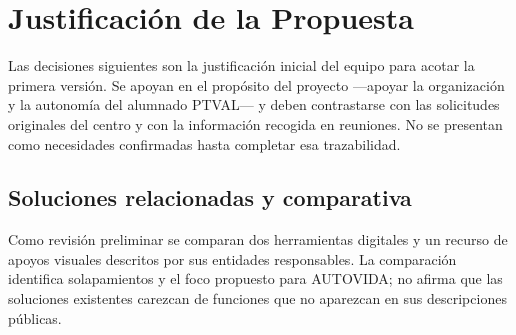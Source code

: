 \newpage
\section{Justificación de la Propuesta}

Las decisiones siguientes son la justificación inicial del equipo para acotar la primera versión. Se apoyan en el propósito del proyecto —apoyar la organización y la autonomía del alumnado PTVAL— y deben contrastarse con las solicitudes originales del centro y con la información recogida en reuniones. No se presentan como necesidades confirmadas hasta completar esa trazabilidad.

\subsection{Soluciones relacionadas y comparativa}
Como revisión preliminar se comparan dos herramientas digitales y un recurso de apoyos visuales descritos por sus entidades responsables. La comparación identifica solapamientos y el foco propuesto para AUTOVIDA; no afirma que las soluciones existentes carezcan de funciones que no aparezcan en sus descripciones públicas.

